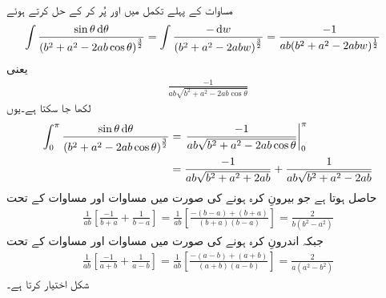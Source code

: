 مساوات  کے پہلے تکمل میں  اور  پُر کر کے حل کرتے ہوئے
\begin{align}\label{مساوات_کولمب_کرہ_بار_پہلا_تکمل_الف}
\int \frac{ \sin \theta \dif \theta}{ \left(b^2+a^2-2 ab \cos \theta \right)^{\frac{3}{2}}}&=\int \frac{-\dif w}{\left(b^2+a^2-2 ab w \right)^{\frac{3}{2}}}=\frac{-1}{ab (b^2+a^2-2abw)^{\frac{1}{2}}}
\end{align}
یعنی
\begin{align*}
\frac{-1}{ab \sqrt{b^2+a^2-2ab\cos \theta}}
\end{align*}
لکھا جا سکتا ہے۔یوں
\begin{gather}
\begin{aligned}
\int_0^{\pi} \frac{ \sin \theta \dif \theta}{ \left(b^2+a^2-2 ab \cos \theta \right)^{\frac{3}{2}}}&=\left. \frac{-1}{ab \sqrt{b^2+a^2-2ab\cos \theta}} \right|_{0}^{\pi}\\
&=\frac{-1}{ab \sqrt{b^2+a^2+2ab}}+\frac{1}{ab \sqrt{b^2+a^2-2ab}}
\end{aligned}
\end{gather}
حاصل ہوتا ہے جو  بیرونِ کرہ ہونے کی صورت میں مساوات  اور مساوات  کے تحت
\begin{align}\label{مساوات_کولمب_کرہ_کے_باہر_پہلا_تکمل}
\frac{1}{ab} \left[\frac{-1}{b+a}+\frac{1}{b-a} \right]=\frac{1}{ab} \left[\frac{-(b-a)+(b+a)}{(b+a)(b-a)}\right]=\frac{2}{b(b^2-a^2)}
\end{align}
جبکہ  اندرونِ کرہ ہونے کی صورت میں مساوات  اور مساوات  کے تحت
\begin{align}\label{مساوات_کولمب_کرہ_کے_اندر_پہلا_تکمل}
\frac{1}{ab} \left[\frac{-1}{a+b}+\frac{1}{a-b} \right]=\frac{1}{ab} \left[\frac{-(a-b)+(a+b)}{(a+b)(a-b)} \right]=\frac{2}{a(a^2-b^2)}
\end{align}
شکل اختیار کرتا ہے۔

